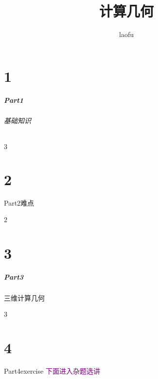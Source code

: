 \documentclass[aspectratio=1610]{beamer}
\begin{document}
\title{计算几何}
\author{laofu}
\begin{frame}
\titlepage
\end{frame}

\part{1}
\begin{frame}
\frametitle{Part1}
\framesubtitle{基础知识}
\begin{multicols}{3}
\tableofcontents
\end{multicols}
\end{frame}







\part{2}
\begin{frame}{Part2}{难点}
\begin{multicols}{2}
\tableofcontents
\end{multicols}
\end{frame}





\part{3}
\begin{frame}
\frametitle{Part3}{三维计算几何}
\begin{multicols}{3}
\tableofcontents
\end{multicols}
\end{frame}



\part{4}
\begin{frame}{Part4}{exercise}
\textcolor{purple}{\huge{下面进入杂题选讲}}
\end{frame}




\end{document}
